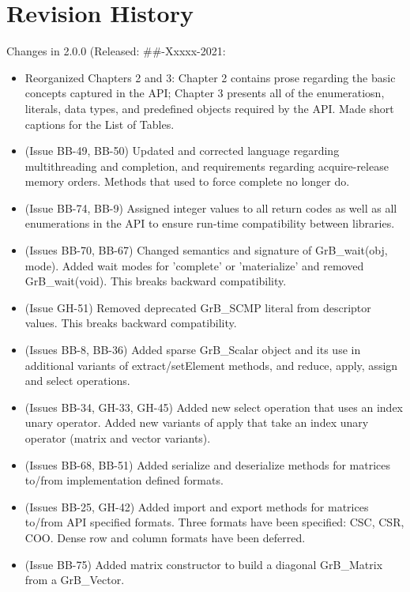 \chapter{Revision History}
\label{Chp:RevHistory}

Changes in 2.0.0 (Released: \#\#-Xxxxx-2021:
\begin{itemize}
\item Reorganized Chapters 2 and 3: Chapter 2 contains prose regarding the basic concepts captured in the API; Chapter 3 presents all of the enumeratiosn, literals, data types, and predefined objects required by the API.  Made short captions for the List of Tables.
\item (Issue BB-49, BB-50) Updated and corrected language regarding multithreading and completion, and requirements regarding acquire-release memory orders.  Methods that used to force complete no longer do.
\item (Issue BB-74, BB-9) Assigned integer values to all return codes as well as all enumerations in the API to ensure run-time compatibility between libraries.
\item (Issues BB-70, BB-67) Changed semantics and signature of {\sf GrB\_wait(obj, mode)}. Added wait modes for 'complete' or 'materialize' and removed {\sf GrB\_wait(void)}. {\color{red} This breaks backward compatibility.}
\item (Issue GH-51) Removed deprecated {\sf GrB\_SCMP} literal from descriptor values. {\color{red} This breaks backward compatibility.}
\item (Issues BB-8, BB-36) Added sparse {\sf GrB\_Scalar} object and its use in additional variants of extract/setElement methods, and reduce, apply, assign and select operations.
\item (Issues BB-34, GH-33, GH-45) Added new select operation that uses an index unary operator. Added new variants of apply that take an index unary operator (matrix and vector variants).
\item (Issues BB-68, BB-51) Added serialize and deserialize methods for matrices to/from implementation defined formats.
\item (Issues BB-25, GH-42) Added import and export methods for matrices to/from API specified formats.  Three formats have been specified: CSC, CSR, COO.  Dense row and column formats have been deferred.
\item (Issue BB-75) Added matrix constructor to build a diagonal {\sf GrB\_Matrix} from a {\sf GrB\_Vector}.

\end{itemize}
